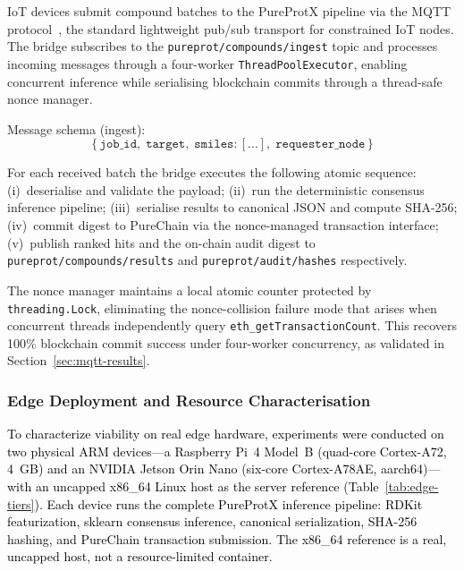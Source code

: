 \documentclass[conference]{IEEEtran}
\begin{document}
IoT devices submit compound batches to the PureProtX pipeline
via the MQTT protocol~\cite{mqtt5}, the standard lightweight
pub/sub transport for constrained IoT nodes.
The bridge subscribes to the \texttt{pureprot/compounds/ingest}
topic and processes incoming messages through a four-worker
\texttt{ThreadPoolExecutor}, enabling concurrent inference while
serialising blockchain commits through a thread-safe nonce manager.

Message schema (ingest):
\begin{equation*}
\{\,\texttt{job\_id},\; \texttt{target},\;
   \texttt{smiles}: [\ldots],\;
   \texttt{requester\_node}\,\}
\end{equation*}

For each received batch the bridge executes the following
atomic sequence: (i)~deserialise and validate the payload;
(ii)~run the deterministic consensus inference pipeline;
(iii)~serialise results to canonical JSON and compute SHA-256;
(iv)~commit digest to PureChain via the nonce-managed
transaction interface; (v)~publish ranked hits and the
on-chain audit digest to \texttt{pureprot/compounds/results}
and \texttt{pureprot/audit/hashes} respectively.

The nonce manager maintains a local atomic counter protected
by \texttt{threading.Lock}, eliminating the nonce-collision
failure mode that arises when concurrent threads independently
query \texttt{eth\_getTransactionCount}.
This recovers 100\% blockchain commit success under
four-worker concurrency, as validated in
Section~\ref{sec:mqtt-results}.

\subsubsection{Edge Deployment and Resource Characterisation}
\label{sec:edge-deploy}

\textcolor{black}{To characterize viability on real edge hardware,
experiments were conducted on two physical ARM devices---a
Raspberry Pi~4 Model~B (quad-core Cortex-A72, 4~GB) and an
NVIDIA Jetson Orin Nano (six-core Cortex-A78AE, aarch64)---with
an uncapped x86\_64 Linux host as the server reference
(Table~\ref{tab:edge-tiers}). Each device runs the complete
PureProtX inference pipeline: RDKit featurization, sklearn
consensus inference, canonical serialization, SHA-256 hashing,
and PureChain transaction submission. The x86\_64 reference is
a real, uncapped host, not a resource-limited container.}
\end{document}
